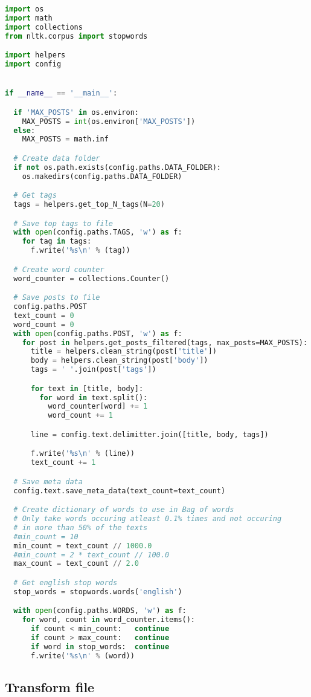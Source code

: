 \begin{lstlisting}[language=python]
import os
import math
import collections
from nltk.corpus import stopwords

import helpers
import config


if __name__ == '__main__':

  if 'MAX_POSTS' in os.environ:
    MAX_POSTS = int(os.environ['MAX_POSTS'])
  else:
    MAX_POSTS = math.inf

  # Create data folder
  if not os.path.exists(config.paths.DATA_FOLDER):
    os.makedirs(config.paths.DATA_FOLDER)

  # Get tags
  tags = helpers.get_top_N_tags(N=20)

  # Save top tags to file
  with open(config.paths.TAGS, 'w') as f:
    for tag in tags:
      f.write('%s\n' % (tag))

  # Create word counter
  word_counter = collections.Counter()

  # Save posts to file
  config.paths.POST
  text_count = 0
  word_count = 0
  with open(config.paths.POST, 'w') as f:
    for post in helpers.get_posts_filtered(tags, max_posts=MAX_POSTS):
      title = helpers.clean_string(post['title'])
      body = helpers.clean_string(post['body'])
      tags = ' '.join(post['tags'])

      for text in [title, body]:
        for word in text.split():
          word_counter[word] += 1
          word_count += 1

      line = config.text.delimitter.join([title, body, tags])

      f.write('%s\n' % (line))
      text_count += 1

  # Save meta data
  config.text.save_meta_data(text_count=text_count)

  # Create dictionary of words to use in Bag of words
  # Only take words occuring atleast 0.1% times and not occuring
  # in more than 50% of the texts
  #min_count = 10
  min_count = text_count // 1000.0
  #min_count = 2 * text_count // 100.0
  max_count = text_count // 2.0

  # Get english stop words
  stop_words = stopwords.words('english')

  with open(config.paths.WORDS, 'w') as f:
    for word, count in word_counter.items():
      if count < min_count:   continue
      if count > max_count:   continue
      if word in stop_words:  continue
      f.write('%s\n' % (word))
\end{lstlisting}

\subsection{Transform file}
\label{app:transform}

